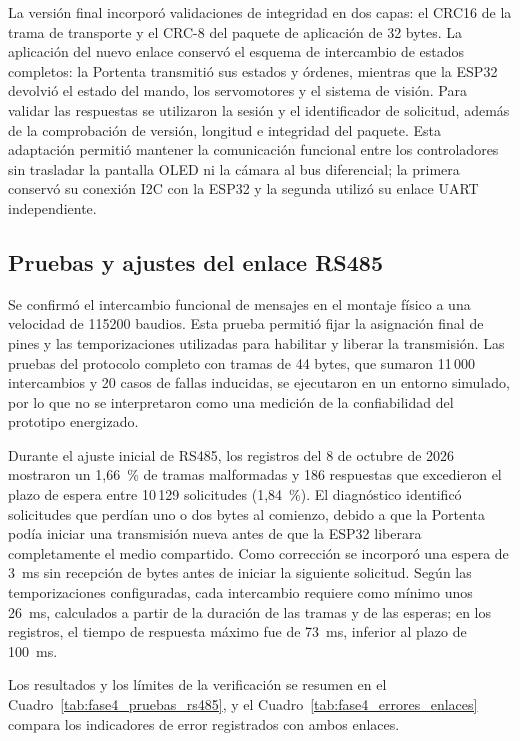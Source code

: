 La versión final incorporó validaciones de integridad en dos capas: el CRC16 de la trama de transporte y el CRC-8 del paquete de aplicación de 32 bytes. La aplicación del nuevo enlace conservó el esquema de intercambio de estados completos: la Portenta transmitió sus estados y órdenes, mientras que la ESP32 devolvió el estado del mando, los servomotores y el sistema de visión. Para validar las respuestas se utilizaron la sesión y el identificador de solicitud, además de la comprobación de versión, longitud e integridad del paquete. Esta adaptación permitió mantener la comunicación funcional entre los controladores sin trasladar la pantalla OLED ni la cámara al bus diferencial; la primera conservó su conexión I2C con la ESP32 y la segunda utilizó su enlace UART independiente.

\subsection{Pruebas y ajustes del enlace RS485}

Se confirmó el intercambio funcional de mensajes en el montaje físico a una velocidad de 115200 baudios. Esta prueba permitió fijar la asignación final de pines y las temporizaciones utilizadas para habilitar y liberar la transmisión. Las pruebas del protocolo completo con tramas de 44 bytes, que sumaron 11\,000 intercambios y 20 casos de fallas inducidas, se ejecutaron en un entorno simulado, por lo que no se interpretaron como una medición de la confiabilidad del prototipo energizado.

Durante el ajuste inicial de RS485, los registros del 8 de octubre de 2026 mostraron un 1,66~\% de tramas malformadas y 186 respuestas que excedieron el plazo de espera entre 10\,129 solicitudes (1,84~\%). El diagnóstico identificó solicitudes que perdían uno o dos bytes al comienzo, debido a que la Portenta podía iniciar una transmisión nueva antes de que la ESP32 liberara completamente el medio compartido. Como corrección se incorporó una espera de 3~ms sin recepción de bytes antes de iniciar la siguiente solicitud. Según las temporizaciones configuradas, cada intercambio requiere como mínimo unos 26~ms, calculados a partir de la duración de las tramas y de las esperas; en los registros, el tiempo de respuesta máximo fue de 73~ms, inferior al plazo de 100~ms.

Los resultados y los límites de la verificación se resumen en el Cuadro~\ref{tab:fase4_pruebas_rs485}, y el Cuadro~\ref{tab:fase4_errores_enlaces} compara los indicadores de error registrados con ambos enlaces.

